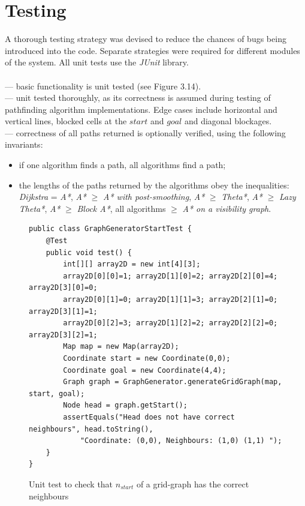\documentclass[12pt,notitlepage]{report}
\begin{document}
\section{Testing}

A thorough testing strategy was devised to reduce the chances of bugs being introduced into the code. Separate strategies were required for different modules of the system. All unit tests use the {\em JUnit} library.\\

\\

 --- basic functionality is unit tested (see Figure 3.14).\\

 --- unit tested thoroughly, as its correctness is assumed during testing of pathfinding algorithm implementations. Edge cases include horizontal and vertical lines, blocked cells at the $start$ and $goal$ and diagonal blockages.\\

 --- correctness of all paths returned is optionally verified, using the following invariants:
  \begin{itemize}
  \item if one algorithm finds a path, all algorithms find a path;
  \item the lengths of the paths returned by the algorithms obey the inequalities: {\em Dijkstra} = {\em A*}, {\em A*} $\geq$ {\em A* with post-smoothing}, {\em A*} $\geq$ {\em Theta*}, {\em A*} $\geq$ {\em Lazy Theta*}, {\em A*} $\geq$ {\em Block A*}, all algorithms $\geq$ {\em A* on a visibility graph}.
  \end{itemize}  
  
  \begin{figure}
\begin{lstlisting}
public class GraphGeneratorStartTest {
	@Test
	public void test() {
		int[][] array2D = new int[4][3];
		array2D[0][0]=1; array2D[1][0]=2; array2D[2][0]=4; array2D[3][0]=0;
		array2D[0][1]=0; array2D[1][1]=3; array2D[2][1]=0; array2D[3][1]=1;
		array2D[0][2]=3; array2D[1][2]=2; array2D[2][2]=0; array2D[3][2]=1;
		Map map = new Map(array2D);
		Coordinate start = new Coordinate(0,0);
		Coordinate goal = new Coordinate(4,4);
		Graph graph = GraphGenerator.generateGridGraph(map, start, goal);
		Node head = graph.getStart();
		assertEquals("Head does not have correct neighbours", head.toString(), 
			"Coordinate: (0,0), Neighbours: (1,0) (1,1) ");
	}
}
\end{lstlisting}
\caption{Unit test to check that $n_{start}$ of a grid-graph has the correct neighbours}
\end{figure}
  
\end{document}
